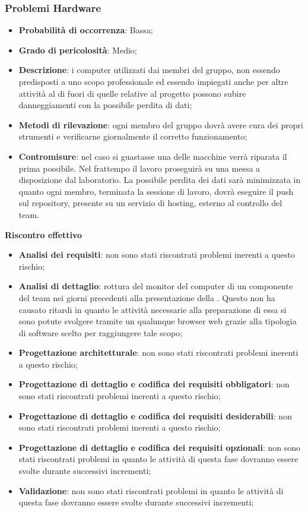 		\subsubsection{Problemi Hardware} %
		\label{ssub:problemi_hardware}
			\begin{itemize}
				\item \textbf{Probabilità di occorrenza}: Bassa;
				\item \textbf{Grado di pericolosità}: Medio;
				\item \textbf{Descrizione}: i computer utilizzati dai membri del gruppo, non essendo predisposti a uno scopo professionale ed essendo impiegati anche per altre attività al di fuori di quelle relative al progetto possono subire danneggiamenti con la possibile perdita di dati;
				\item \textbf{Metodi di rilevazione}: ogni membro del gruppo dovrà avere cura dei propri strumenti e verificarne giornalmente il corretto funzionamento;
				\item \textbf{Contromisure}: nel caso si guastasse una delle macchine verrà riparata il prima possibile. Nel frattempo il lavoro proseguirà su una messa a disposizione dal laboratorio. La possibile perdita dei dati sarà minimizzata in quanto ogni membro, terminata la sessione di lavoro, dovrà eseguire il push sul repository, presente su un servizio di hosting, esterno al controllo del team.
			\end{itemize}
		\noindent
		\textbf{Riscontro effettivo}
			\begin{itemize}
				\item \textbf{Analisi dei requisiti}: non sono stati riscontrati problemi inerenti a questo rischio;
				\item \textbf{Analisi di dettaglio}: rottura del monitor del computer di un componente del team nei giorni precedenti alla presentazione della \RR. Questo non ha causato ritardi in quanto le attività necessarie alla preparazione di essa si sono potute svolgere tramite un qualunque browser web grazie alla tipologia di software scelto per raggiungere tale scopo;
				\item \textbf{Progettazione architetturale}: non sono stati riscontrati problemi inerenti a questo rischio;
				\item \textbf{Progettazione di dettaglio e codifica dei requisiti obbligatori}: non sono stati riscontrati problemi inerenti a questo rischio;
				\item \textbf{Progettazione di dettaglio e codifica dei requisiti desiderabili}: non sono stati riscontrati problemi inerenti a questo rischio;
				\item \textbf{Progettazione di dettaglio e codifica dei requisiti opzionali}: non sono stati riscontrati problemi in quanto le attività di questa fase dovranno essere svolte durante successivi incrementi;
				\item \textbf{Validazione}: non sono stati riscontrati problemi in quanto le attività di questa fase dovranno essere svolte durante successivi incrementi;
			\end{itemize}
		
